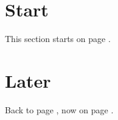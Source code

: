 \documentclass{article}
\begin{document}
\section{Start}\label{sec:start}
This section starts on page \pageref{sec:start}.
\newpage
\section{Later}\label{sec:later}
Back to page \pageref{sec:start}, now on page \pageref{sec:later}.
\end{document}
